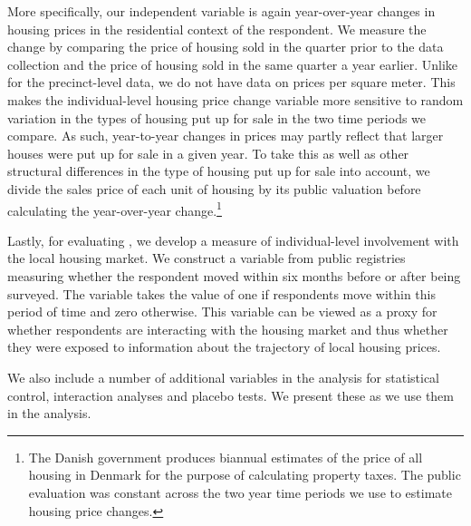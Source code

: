 \documentclass[12pt,a4paper]{article}
\begin{document}
	More specifically, our independent variable is again year-over-year changes in housing prices in the residential context of the respondent. We measure the change by comparing the price of housing sold in the quarter prior to the data collection and the price of housing sold in the same quarter a year earlier. Unlike for the precinct-level data, we do not have data on prices per square meter. This makes the individual-level housing price change variable more sensitive to random variation in the types of housing put up for sale in the two time periods we compare. As such, year-to-year changes in prices may partly reflect that larger houses were put up for sale in a given year. To take this as well as other structural differences in the type of housing put up for sale into account, we divide the sales price of each unit of housing by its public valuation before calculating the year-over-year change.\footnote{The Danish government produces biannual estimates of the price of all housing in Denmark for the purpose of calculating property taxes. The public evaluation was constant across the two year time periods we use to estimate housing price changes.}
	
	Lastly, for evaluating \htwo, we develop a measure of individual-level involvement with the local housing market. We construct a variable from public registries measuring whether the respondent moved within six months before or after being surveyed. The variable takes the value of one if respondents move within this period of time and zero otherwise. This variable can be viewed as a proxy for whether respondents are interacting with the housing market and thus whether they were exposed to information about the trajectory of local housing prices.
	
	We also include a number of additional variables in the analysis for statistical control, interaction analyses and placebo tests. We present these as we use them in the analysis. 
	
\end{document}
